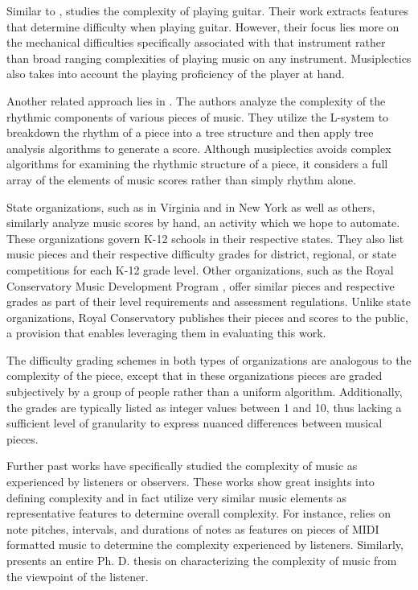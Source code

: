 \documentclass[12pt]{report}
\begin{document}
Similar to \cite{Chiu2012}, \cite{Heijink2002} studies the complexity of playing guitar. Their work extracts features that determine difficulty when playing guitar. However, their focus lies more on the mechanical difficulties specifically associated with that instrument rather than broad ranging complexities of playing music on any instrument. Musiplectics also takes into account the playing proficiency of the player at hand.

Another related approach lies in \cite{Liou2010}. The authors analyze the complexity of the rhythmic components of various pieces of music. They utilize the L-system to breakdown the rhythm of a piece into a tree structure and then apply tree analysis algorithms to generate a score. Although musiplectics avoids complex algorithms for examining the rhythmic structure of a piece, it considers a full array of the elements of music scores rather than simply rhythm alone.

State organizations, such as \cite{VBODA} in Virginia and \cite{NYSSMA} in New York as well as others, similarly analyze music scores by hand, an activity which we hope to automate. These organizations govern K-12 schools in their respective states. They also list music pieces and their respective difficulty grades for district, regional, or state competitions for each K-12 grade level. Other organizations, such as the Royal Conservatory Music Development Program \cite{RoyalSyllabus}, offer similar pieces and respective grades as part of their level requirements and assessment regulations. Unlike state organizations, Royal Conservatory publishes their pieces and scores to the public, a provision that enables leveraging them in evaluating this work.

The difficulty grading schemes in both types of organizations are analogous to the complexity of the piece, except that in these organizations pieces are graded subjectively by a group of people rather than a uniform algorithm. Additionally, the grades are typically listed as integer values between 1 and 10, thus lacking a sufficient level of granularity to express nuanced differences between musical pieces.

Further past works have specifically studied the complexity of music as experienced by listeners or observers. These works show great insights into defining complexity and in fact utilize very similar music elements as representative features to determine overall complexity. For instance, \cite{madsen2006music} relies on note pitches, intervals, and durations of notes as features on pieces of MIDI formatted music to determine the complexity experienced by listeners. Similarly, \cite{streich2006automatic} presents an entire Ph. D. thesis on characterizing the complexity of music from the viewpoint of the listener.
\end{document}
